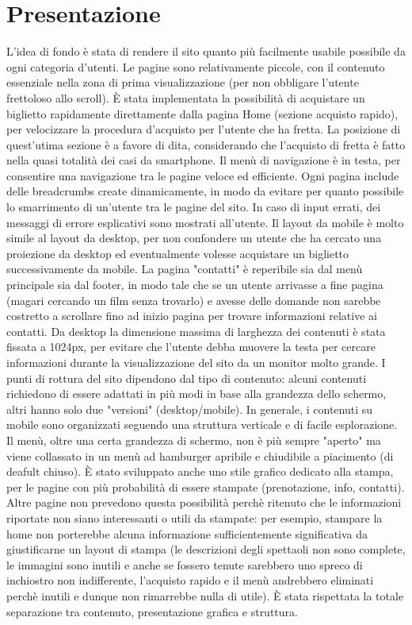\documentclass[a4paper, 12pt]{article}
\begin{document}
\section{Presentazione}
L'idea di fondo è stata di rendere il sito quanto più facilmente usabile possibile da ogni categoria d'utenti.
Le pagine sono relativamente piccole, con il contenuto essenziale nella zona di prima visualizzazione (per non obbligare l'utente frettoloso allo scroll).
È stata implementata la possibilità di acquistare un biglietto rapidamente direttamente dalla pagina Home (sezione acquisto rapido), per velocizzare la procedura d'acquisto per l'utente che ha fretta.
La posizione di quest'utima sezione è a favore di dita, considerando che l'acquisto di fretta è fatto nella quasi totalità dei casi da smartphone.
Il menù di navigazione è in testa, per consentire una navigazione tra le pagine veloce ed efficiente.
Ogni pagina include delle breadcrumbs create dinamicamente, in modo da evitare per quanto possibile lo smarrimento di un'utente tra le pagine del sito.
In caso di input errati, dei messaggi di errore esplicativi sono mostrati all'utente.
Il layout da mobile è molto simile al layout da desktop, per non confondere un utente che ha cercato una proiezione da desktop ed eventualmente volesse acquistare un biglietto successivamente da mobile.
La pagina "contatti" è reperibile sia dal menù principale sia dal footer, in modo tale che se un utente arrivasse a fine pagina (magari cercando un film senza trovarlo) e avesse delle domande non sarebbe costretto a scrollare fino ad inizio pagina per trovare informazioni relative ai contatti.
Da desktop la dimensione massima di larghezza dei contenuti è stata fissata a 1024px, per evitare che l'utente debba muovere la testa per cercare informazioni durante la visualizzazione del sito da un monitor molto grande.
I punti di rottura del sito dipendono dal tipo di contenuto: alcuni contenuti richiedono di essere adattati in più modi in base alla grandezza dello schermo, altri hanno solo due "versioni" (desktop/mobile).
In generale, i contenuti su mobile sono organizzati seguendo una struttura verticale e di facile esplorazione. Il menù, oltre una certa grandezza di schermo, non è più sempre "aperto" ma viene collassato in un menù ad
hamburger apribile e chiudibile a piacimento (di deafult chiuso).
È stato sviluppato anche uno stile grafico dedicato alla stampa, per le pagine con più probabilità di essere stampate (prenotazione, info, contatti).
Altre pagine non prevedono questa possibilità perchè ritenuto che le informazioni riportate non siano interessanti o utili da stampate: per esempio, stampare la home non porterebbe alcuna informazione sufficientemente significativa da giustificarne un layout di stampa (le descrizioni degli spettaoli non sono complete, le immagini sono inutili e anche se fossero tenute sarebbero uno spreco di inchiostro
non indifferente, l'acquisto rapido e il menù andrebbero eliminati perchè inutili e dunque non rimarrebbe nulla di utile).
È stata rispettata la totale separazione tra contenuto, presentazione grafica e struttura.
\end{document}

